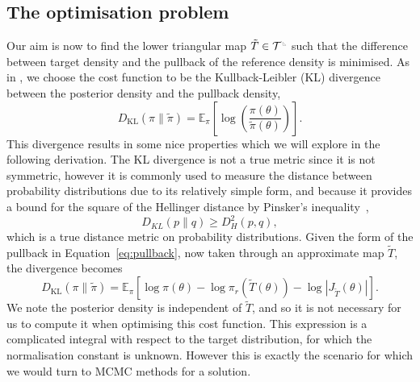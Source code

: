 \documentclass[final]{siamltex}
\newcommand{\ltri}{%
\,\resizebox{!}{0.25\baselineskip}{%
\begin{tikzpicture}%
\draw[line width=1mm](0,0) -- (0,2) -- (2,0)  -- (0,0);
\end{tikzpicture}%
}\xspace%
}%
\begin{document}
\subsection{The optimisation problem}
Our aim is now to find the lower triangular map $\tilde{T} \in
\mathcal{T}^{\ltri}$ such that the difference between target
density and the pullback of the reference density is minimised. As in
\cite{parno2018transport}, we choose the cost function
to be the Kullback-Leibler (KL) divergence between the posterior density and the pullback density,
\begin{equation}
	D_\text{KL}(\pi\|\tilde{\pi}) =
		\mathbb{E}_\pi\left[\log\left(\frac{\pi(\theta)}{\tilde{\pi}(\theta)}\right)\right].
\end{equation}
This divergence results in some nice properties which we will explore in the following derivation. The KL divergence is not a true metric since it is not symmetric, however it is commonly used to measure the distance between probability distributions due to its relatively simple form, and because it provides a bound for the square of the Hellinger distance by Pinsker's inequality~\cite{pinsker1960information},
\begin{equation}
	D_{KL}(p\|q) \geq D_H^2(p,q),
\end{equation}
which is a true distance metric on probability distributions.
Given the form of the pullback in Equation~\eqref{eq:pullback}, now taken through an approximate map $\tilde{T}$, the divergence becomes
\begin{equation}
	D_\text{KL}(\pi\|\tilde{\pi}) = \mathbb{E}_\pi\left[\log\pi(\theta) - \log\pi_r(\tilde{T}(\theta)) -
		\log\left|J_{\tilde{T}}(\theta)\right|\right].
\end{equation}
We note the posterior density is independent of $\tilde{T}$, and so it is not necessary for us to compute it when optimising this cost function. This expression is a complicated integral with respect to the target distribution, for which the normalisation constant is unknown. However this is exactly the scenario for which we would turn to MCMC methods for a solution.
\end{document}

